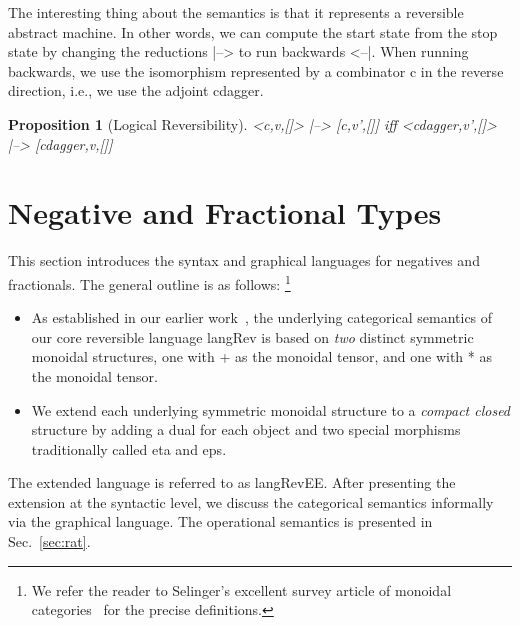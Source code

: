 \documentclass[preprint]{sigplanconf}
\newcommand{\xcomment}[2]{\textbf{#1:~\textsl{#2}}}
\newcommand{\roshan}[1]{\xcomment{Roshan}{#1}}
\newtheorem{proposition}[theorem]{Proposition}
\begin{document}
The interesting thing about the semantics is that it represents a reversible
abstract machine. In other words, we can compute the start state from the
stop state by changing the reductions {{|-->}} to run backwards
{{<--|}}. When running backwards, we use the isomorphism represented by a
combinator {{c}} in the reverse direction, i.e., we use the adjoint
{{c{dagger}}}.

\begin{proposition}[Logical Reversibility]
\label{prop:logrev}
{{<c,v,[]> |--> [c,v',[]]}} iff 
{{<c{dagger},v',[]> |--> [c{dagger},v,[]]}} 
\end{proposition}




\section{Negative and Fractional Types}
\label{sec:neg}
\label{sec:frac}

This section introduces the syntax and graphical languages for
negatives and fractionals.  The general outline is as follows:
\footnote{We refer the reader to Selinger's excellent survey
  article of monoidal
  categories~\cite{springerlink:10.1007/978-3-642-12821-94} for the precise
  definitions.}
\begin{itemize}
\item As established in our earlier work~\cite{rc2011,infeffects}, the
  underlying categorical semantics of our core reversible language
  {{langRev}} is based on \emph{two} distinct symmetric monoidal structures,
  one with {{+}} as the monoidal tensor, and one with {{*}} as the monoidal
  tensor.
\item We extend each underlying symmetric monoidal structure to a
  \emph{compact closed} structure by adding a dual for each object and two
  special morphisms traditionally called {{eta}} and {{eps}}. 
\end{itemize}
The extended language is referred to as {{langRevEE}}.  After
presenting the extension at the syntactic level, we discuss the
categorical semantics informally via the graphical language. The
operational semantics is presented in Sec.~\ref{sec:rat}.
\end{document}
